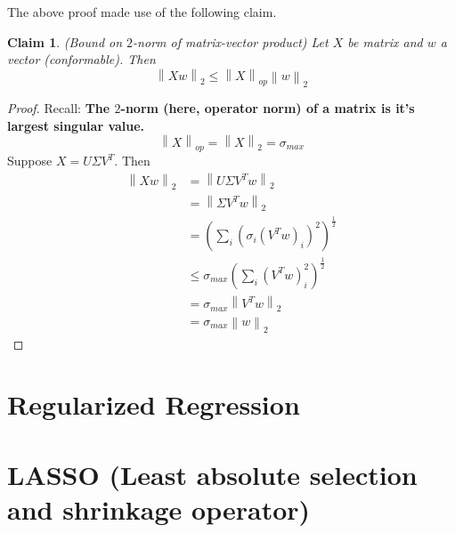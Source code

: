 \documentclass[12pt]{article}
\newtheorem{claim}{Claim}
\theoremstyle{definition}
\newcommand{\norm}[1]{\left\lVert#1\right\rVert}
\begin{document}
The above proof made use of the following claim.
\begin{claim}(Bound on $2$-norm of matrix-vector product)
Let $X$ be matrix and $w$ a vector (conformable). Then
\begin{equation}
	\norm{Xw}_{2} \leq \norm{X}_{op}\norm{w}_2
\end{equation}
\end{claim}
\begin{proof}
Recall: \textbf{The $2$-norm (here, operator norm) of a matrix is it's largest singular value.}
\begin{equation}
	\norm{X}_{op} = \norm{X}_2 = \sigma_{max}
\end{equation}
Suppose $X = U\Sigma V^T$. Then
\begin{align*}
	\norm{Xw}_2 &= \norm{U\Sigma V^T w}_2 \\
	&= \norm{\Sigma V^T w}_2 \tag{$U$ orthonormal, preserves norms} \\
	&= \left(\sum_i\left(\sigma_i (V^T w)_i \right)^2 \right)^{\frac{1}{2}} \\
	&\leq \sigma_{max} \left(\sum_i(V^T w)^2_i \right)^{\frac{1}{2}} \\
	&= \sigma_{max} \norm{V^T w}_2 \tag{definition of norm} \\
	&= \sigma_{max} \norm{w}_2 \tag{$V, V^T$ orthonormal, preserves norms}
\end{align*}
\end{proof}

\section{Regularized Regression}


\section{LASSO (Least absolute selection and shrinkage operator)}
\end{document}
